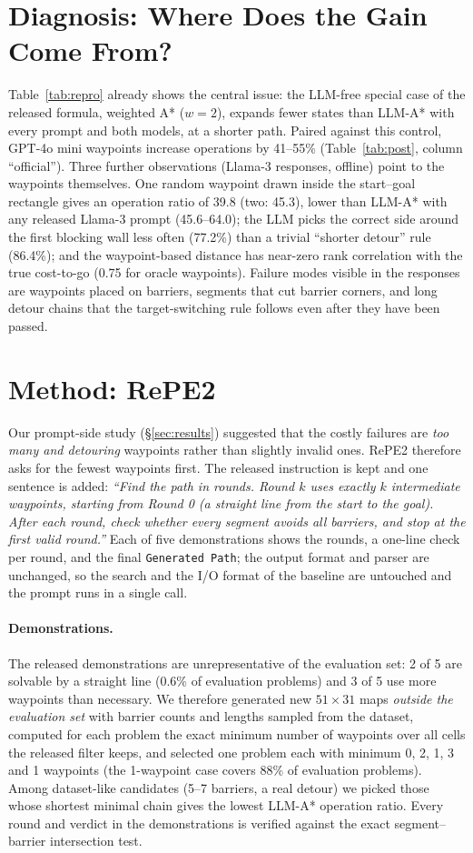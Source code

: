 \documentclass[11pt]{article}
\begin{document}
\section{Diagnosis: Where Does the Gain Come From?}
\label{sec:diag}
Table~\ref{tab:repro} already shows the central issue: the LLM-free special case of the released formula, weighted A* ($w{=}2$), expands fewer states than LLM-A* with every prompt and both models, at a shorter path.
Paired against this control, GPT-4o mini waypoints increase operations by 41--55\% (Table~\ref{tab:post}, column ``official'').
Three further observations (Llama-3 responses, offline) point to the waypoints themselves.
One random waypoint drawn inside the start--goal rectangle gives an operation ratio of 39.8 (two: 45.3), lower than LLM-A* with any released Llama-3 prompt (45.6--64.0);
the LLM picks the correct side around the first blocking wall less often (77.2\%) than a trivial ``shorter detour'' rule (86.4\%);
and the waypoint-based distance has near-zero rank correlation with the true cost-to-go (0.75 for oracle waypoints).
Failure modes visible in the responses are waypoints placed on barriers, segments that cut barrier corners, and long detour chains that the target-switching rule follows even after they have been passed.

\section{Method: RePE2}
\label{sec:method}
Our prompt-side study (\S\ref{sec:results}) suggested that the costly failures are \emph{too many and detouring} waypoints rather than slightly invalid ones.
RePE2 therefore asks for the fewest waypoints first.
The released instruction is kept and one sentence is added: \emph{``Find the path in rounds. Round $k$ uses exactly $k$ intermediate waypoints, starting from Round 0 (a straight line from the start to the goal). After each round, check whether every segment avoids all barriers, and stop at the first valid round.''}
Each of five demonstrations shows the rounds, a one-line check per round, and the final \texttt{Generated Path}; the output format and parser are unchanged, so the search and the I/O format of the baseline are untouched and the prompt runs in a single call.
\paragraph{Demonstrations.}
The released demonstrations are unrepresentative of the evaluation set: 2 of 5 are solvable by a straight line (0.6\% of evaluation problems) and 3 of 5 use more waypoints than necessary.
We therefore generated new $51\times31$ maps \emph{outside the evaluation set} with barrier counts and lengths sampled from the dataset, computed for each problem the exact minimum number of waypoints over all cells the released filter keeps, and selected one problem each with minimum 0, 2, 1, 3 and 1 waypoints (the 1-waypoint case covers 88\% of evaluation problems).
Among dataset-like candidates (5--7 barriers, a real detour) we picked those whose shortest minimal chain gives the lowest LLM-A* operation ratio.
Every round and verdict in the demonstrations is verified against the exact segment--barrier intersection test.
\end{document}
